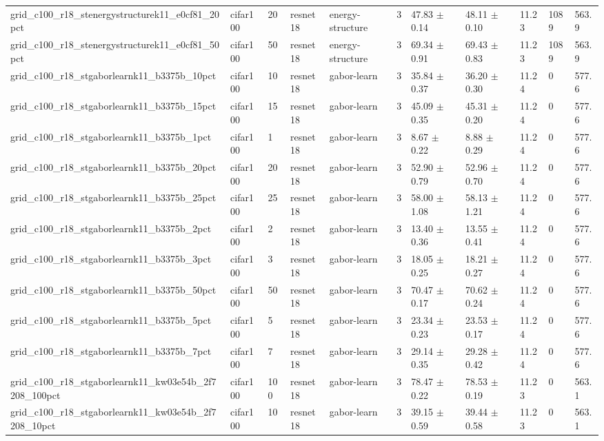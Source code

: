 \begin{tabular}{lllllllllll}
grid_c100_r18_stenergystructurek11_e0cf81_20pct & cifar100 & 20 & resnet18 & energy-structure & 3 & 47.83 $\pm$ 0.14 & 48.11 $\pm$ 0.10 & 11.23 & 1089 & 563.9 \\
grid_c100_r18_stenergystructurek11_e0cf81_50pct & cifar100 & 50 & resnet18 & energy-structure & 3 & 69.34 $\pm$ 0.91 & 69.43 $\pm$ 0.83 & 11.23 & 1089 & 563.9 \\
grid_c100_r18_stgaborlearnk11_b3375b_10pct & cifar100 & 10 & resnet18 & gabor-learn & 3 & 35.84 $\pm$ 0.37 & 36.20 $\pm$ 0.30 & 11.24 & 0 & 577.6 \\
grid_c100_r18_stgaborlearnk11_b3375b_15pct & cifar100 & 15 & resnet18 & gabor-learn & 3 & 45.09 $\pm$ 0.35 & 45.31 $\pm$ 0.20 & 11.24 & 0 & 577.6 \\
grid_c100_r18_stgaborlearnk11_b3375b_1pct & cifar100 & 1 & resnet18 & gabor-learn & 3 & 8.67 $\pm$ 0.22 & 8.88 $\pm$ 0.29 & 11.24 & 0 & 577.6 \\
grid_c100_r18_stgaborlearnk11_b3375b_20pct & cifar100 & 20 & resnet18 & gabor-learn & 3 & 52.90 $\pm$ 0.79 & 52.96 $\pm$ 0.70 & 11.24 & 0 & 577.6 \\
grid_c100_r18_stgaborlearnk11_b3375b_25pct & cifar100 & 25 & resnet18 & gabor-learn & 3 & 58.00 $\pm$ 1.08 & 58.13 $\pm$ 1.21 & 11.24 & 0 & 577.6 \\
grid_c100_r18_stgaborlearnk11_b3375b_2pct & cifar100 & 2 & resnet18 & gabor-learn & 3 & 13.40 $\pm$ 0.36 & 13.55 $\pm$ 0.41 & 11.24 & 0 & 577.6 \\
grid_c100_r18_stgaborlearnk11_b3375b_3pct & cifar100 & 3 & resnet18 & gabor-learn & 3 & 18.05 $\pm$ 0.25 & 18.21 $\pm$ 0.27 & 11.24 & 0 & 577.6 \\
grid_c100_r18_stgaborlearnk11_b3375b_50pct & cifar100 & 50 & resnet18 & gabor-learn & 3 & 70.47 $\pm$ 0.17 & 70.62 $\pm$ 0.24 & 11.24 & 0 & 577.6 \\
grid_c100_r18_stgaborlearnk11_b3375b_5pct & cifar100 & 5 & resnet18 & gabor-learn & 3 & 23.34 $\pm$ 0.23 & 23.53 $\pm$ 0.17 & 11.24 & 0 & 577.6 \\
grid_c100_r18_stgaborlearnk11_b3375b_7pct & cifar100 & 7 & resnet18 & gabor-learn & 3 & 29.14 $\pm$ 0.35 & 29.28 $\pm$ 0.42 & 11.24 & 0 & 577.6 \\
grid_c100_r18_stgaborlearnk11_kw03e54b_2f7208_100pct & cifar100 & 100 & resnet18 & gabor-learn & 3 & 78.47 $\pm$ 0.22 & 78.53 $\pm$ 0.19 & 11.23 & 0 & 563.1 \\
grid_c100_r18_stgaborlearnk11_kw03e54b_2f7208_10pct & cifar100 & 10 & resnet18 & gabor-learn & 3 & 39.15 $\pm$ 0.59 & 39.44 $\pm$ 0.58 & 11.23 & 0 & 563.1 \\

\end{tabular}
